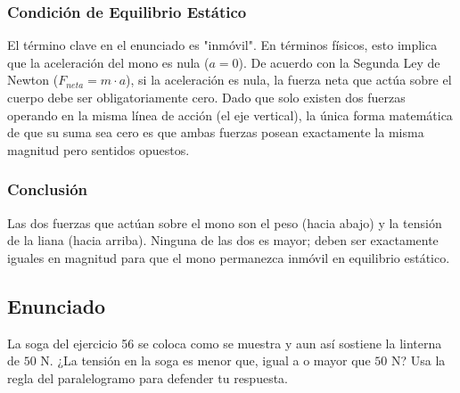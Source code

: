 \documentclass[12pt,letterpaper]{article}
\begin{document}
\subsubsection*{Condición de Equilibrio Estático}
El término clave en el enunciado es "inmóvil". En términos físicos, esto implica que la aceleración del mono es nula ($a = 0$). De acuerdo con la Segunda Ley de Newton ($F_{neta} = m \cdot a$), si la aceleración es nula, la fuerza neta que actúa sobre el cuerpo debe ser obligatoriamente cero. Dado que solo existen dos fuerzas operando en la misma línea de acción (el eje vertical), la única forma matemática de que su suma sea cero es que ambas fuerzas posean exactamente la misma magnitud pero sentidos opuestos.

\subsubsection*{Conclusión}
Las dos fuerzas que actúan sobre el mono son el peso (hacia abajo) y la tensión de la liana (hacia arriba). Ninguna de las dos es mayor; deben ser exactamente iguales en magnitud para que el mono permanezca inmóvil en equilibrio estático.

\newpage
\subsection*{Enunciado}
La soga del ejercicio 56 se coloca como se muestra y aun así sostiene la linterna de $50\text{ N}$. ¿La tensión en la soga es menor que, igual a o mayor que $50\text{ N}$? Usa la regla del paralelogramo para defender tu respuesta.

\begin{center}
\end{center}
\end{document}
